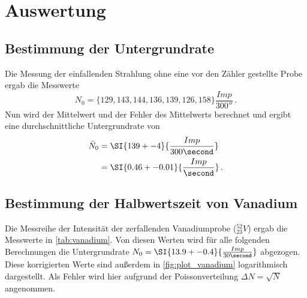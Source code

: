 \section{Auswertung}
\label{sec:Auswertung}

\subsection{Bestimmung der Untergrundrate}
\label{ssec:auswertung_untergrund}

Die Messung der einfallenden Strahlung ohne eine vor den Zähler gestellte Probe ergab die Messwerte
\begin{equation*}
    N_0 = \{129, 143, 144, 136, 139, 126, 158\} \si{\frac{Imp}{300\second}} \, .
\end{equation*}
Nun wird der Mittelwert und der Fehler des Mittelwerts berechnet und ergibt eine durchschnittliche Untergrundrate von
\begin{align*}
    \bar{N}_0 &= \SI{139+-4}{\frac{Imp}{300\second}} \\
              &= \SI{0.46+-0.01}{\frac{Imp}{\second}} \, .
\end{align*}

\subsection{Bestimmung der Halbwertszeit von Vanadium}
\label{ssec:auswertung_vanadium}

Die Messreihe der Intensität der zerfallenden Vanadiumprobe ($ ^{52}_{23}V$) ergab die Messwerte in \autoref{tab:vanadium}. 
Von diesen Werten wird für alle folgenden Berechnungen die Untergrundrate $N_0=\SI{13.9+-0.4}{\frac{Imp}{30\second}}$ abgezogen.
Diese korrigierten Werte sind außerdem in \autoref{fig:plot_vanadium} logarithmisch dargestellt.
Als Fehler wird hier aufgrund der Poissonverteilung $\Delta N = \sqrt{N}$ angenommen.

